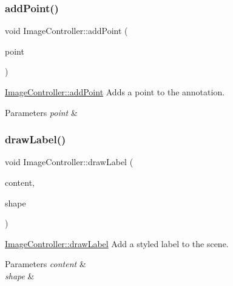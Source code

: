 \subsubsection{\texorpdfstring{add\+Point()}{addPoint()}}
{\footnotesize\ttfamily void Image\+Controller\+::add\+Point (\begin{DoxyParamCaption}\item[{const Q\+Point \&}]{point }\end{DoxyParamCaption})}



\hyperlink{classImageController_adaade0712de089f06a9a267399004cab}{Image\+Controller\+::add\+Point} Adds a point to the annotation. 


\begin{DoxyParams}{Parameters}
{\em point} & \\
\hline
\end{DoxyParams}
\mbox{\label{classImageController_a4980cd42b6086ec8c4647e0043864b40}} 
\subsubsection{\texorpdfstring{draw\+Label()}{drawLabel()}}
{\footnotesize\ttfamily void Image\+Controller\+::draw\+Label (\begin{DoxyParamCaption}\item[{Q\+String}]{content,  }\item[{Q\+Vector$<$ Q\+PointF $>$}]{shape }\end{DoxyParamCaption})\hspace{0.3cm}{\ttfamily [private]}}



\hyperlink{classImageController_a4980cd42b6086ec8c4647e0043864b40}{Image\+Controller\+::draw\+Label} Add a styled label to the scene. 


\begin{DoxyParams}{Parameters}
{\em content} & \\
\hline
{\em shape} & \\
\hline
\end{DoxyParams}
\mbox{\label{classImageController_aaabc0506bd421fc0abf5b06ffc1c7032}} 
